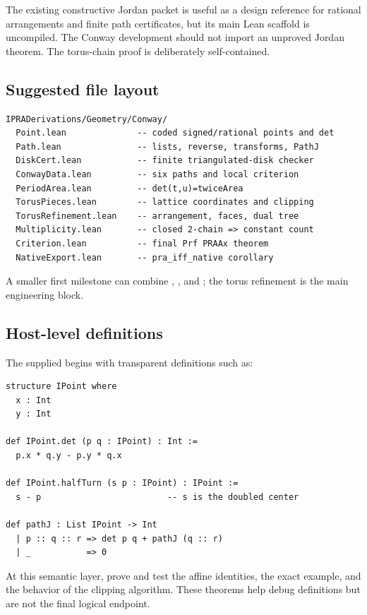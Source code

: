 The existing constructive Jordan packet is useful as a design reference for rational arrangements and finite path certificates, but its main Lean scaffold is uncompiled.  The Conway development should not import an unproved Jordan theorem.  The torus-chain proof is deliberately self-contained.

\subsection{Suggested file layout}

\begin{lstlisting}
IPRADerivations/Geometry/Conway/
  Point.lean              -- coded signed/rational points and det
  Path.lean               -- lists, reverse, transforms, PathJ
  DiskCert.lean           -- finite triangulated-disk checker
  ConwayData.lean         -- six paths and local criterion
  PeriodArea.lean         -- det(t,u)=twiceArea
  TorusPieces.lean        -- lattice coordinates and clipping
  TorusRefinement.lean    -- arrangement, faces, dual tree
  Multiplicity.lean       -- closed 2-chain => constant count
  Criterion.lean          -- final Prf PRAAx theorem
  NativeExport.lean       -- pra_iff_native corollary
\end{lstlisting}

A smaller first milestone can combine , , and ; the torus refinement is the main engineering block.

\subsection{Host-level definitions}

The supplied  begins with transparent definitions such as:

\begin{lstlisting}
structure IPoint where
  x : Int
  y : Int

def IPoint.det (p q : IPoint) : Int :=
  p.x * q.y - p.y * q.x

def IPoint.halfTurn (s p : IPoint) : IPoint :=
  s - p                         -- s is the doubled center

def pathJ : List IPoint -> Int
  | p :: q :: r => det p q + pathJ (q :: r)
  | _           => 0
\end{lstlisting}

At this semantic layer, prove and test the affine identities, the exact example, and the behavior of the clipping algorithm.  These theorems help debug definitions but are not the final logical endpoint.

